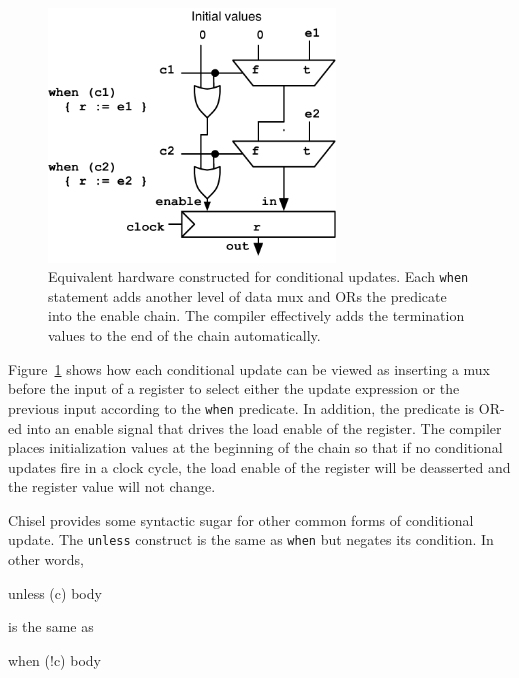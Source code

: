 \documentclass[twocolumn,10pt]{article}
\def\code#1{{\tt #1}}
\begin{document}
\begin{figure}[h]
\centering
\includegraphics[width=3in]{figs/condupdates.pdf}
\caption{Equivalent hardware constructed for conditional updates.
  Each \code{when} statement adds another level of data mux and ORs
  the predicate into the enable chain.  The compiler effectively adds
  the termination values to the end of the chain automatically.}
\label{fig:condupdates}
\end{figure}

Figure~\ref{fig:condupdates} shows how each conditional update can be
viewed as inserting a mux before the input of a register to select
either the update expression or the previous input according to the
\code{when} predicate.  In addition, the predicate is OR-ed into an
enable signal that drives the load enable of the register.  The
compiler places initialization values at the beginning of the chain so
that if no conditional updates fire in a clock cycle, the load enable
of the register will be deasserted and the register value will not
change.
 
Chisel provides some syntactic sugar for other common forms of
conditional update.  The \verb+unless+ construct is the same as
\verb+when+ but negates its condition.  In other words,
\begin{scala}
unless (c) { body }
\end{scala}
is the same as
\begin{scala}
when (!c) { body }
\end{scala}

% 
\end{document}
